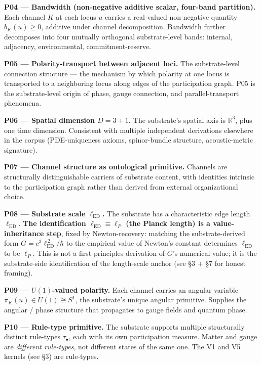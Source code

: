 \documentclass[11pt,a4paper]{article}
\begin{document}
\textbf{P04 --- Bandwidth (non-negative additive scalar, four-band partition).} Each channel $K$ at each locus $u$ carries a real-valued non-negative quantity $b_K(u) \geq 0$, additive under channel decomposition. Bandwidth further decomposes into four mutually orthogonal substrate-level bands: internal, adjacency, environmental, commitment-reserve.

\textbf{P05 --- Polarity-transport between adjacent loci.} The substrate-level connection structure --- the mechanism by which polarity at one locus is transported to a neighboring locus along edges of the participation graph. P05 is the substrate-level origin of phase, gauge connection, and parallel-transport phenomena.

\textbf{P06 --- Spatial dimension $D = 3+1$.} The substrate's spatial axis is $\mathbb{R}^3$, plus one time dimension. Consistent with multiple independent derivations elsewhere in the corpus (PDE-uniqueness axioms, spinor-bundle structure, acoustic-metric signature).

\textbf{P07 --- Channel structure as ontological primitive.} Channels are structurally distinguishable carriers of substrate content, with identities intrinsic to the participation graph rather than derived from external organizational choice.

\textbf{P08 --- Substrate scale $\ell_\mathrm{ED}$.} The substrate has a characteristic edge length $\ell_\mathrm{ED}$. \textbf{The identification $\ell_\mathrm{ED} \equiv \ell_P$ (the Planck length) is a value-inheritance step}, fixed by Newton-recovery: matching the substrate-derived form $G = c^3 \ell_\mathrm{ED}^{\,2}/\hbar$ to the empirical value of Newton's constant determines $\ell_\mathrm{ED}$ to be $\ell_P$. This is not a first-principles derivation of $G$'s numerical value; it is the substrate-side identification of the length-scale anchor (see \S3 + \S7 for honest framing).

\textbf{P09 --- $U(1)$-valued polarity.} Each channel carries an angular variable $\pi_K(u) \in U(1) \cong S^1$, the substrate's unique angular primitive. Supplies the angular / phase structure that propagates to gauge fields and quantum phase.

\textbf{P10 --- Rule-type primitive.} The substrate supports multiple structurally distinct rule-types $\tau_\bullet$, each with its own participation measure. Matter and gauge are \emph{different rule-types}, not different states of the same one. The V1 and V5 kernels (see \S3) are rule-types.
\end{document}
